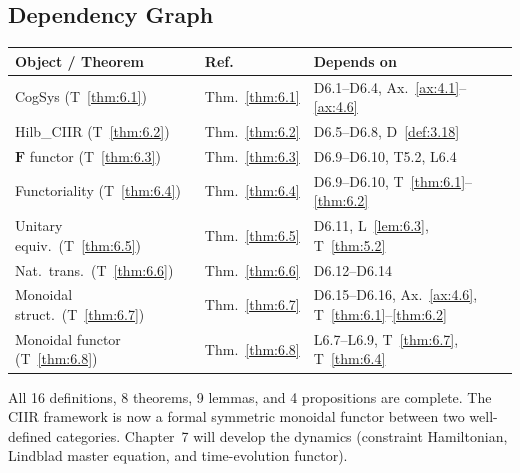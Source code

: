 \subsection{Dependency Graph}
\label{sec:ch6:depgraph}

\begin{center}
\begin{tabular}{lll}
\hline
\textbf{Object / Theorem} & \textbf{Ref.} & \textbf{Depends on} \\
\hline
CogSys (T~\ref{thm:6.1}) & Thm.~\ref{thm:6.1} &
  D6.1--D6.4, Ax.~\ref{ax:4.1}--\ref{ax:4.6} \\
Hilb\_CIIR (T~\ref{thm:6.2}) & Thm.~\ref{thm:6.2} &
  D6.5--D6.8, D~\ref{def:3.18} \\
$\mathbf{F}$ functor (T~\ref{thm:6.3}) & Thm.~\ref{thm:6.3} &
  D6.9--D6.10, T5.2, L6.4 \\
Functoriality (T~\ref{thm:6.4}) & Thm.~\ref{thm:6.4} &
  D6.9--D6.10, T~\ref{thm:6.1}--\ref{thm:6.2} \\
Unitary equiv.\ (T~\ref{thm:6.5}) & Thm.~\ref{thm:6.5} &
  D6.11, L~\ref{lem:6.3}, T~\ref{thm:5.2} \\
Nat.\ trans.\ (T~\ref{thm:6.6}) & Thm.~\ref{thm:6.6} &
  D6.12--D6.14 \\
Monoidal struct.\ (T~\ref{thm:6.7}) & Thm.~\ref{thm:6.7} &
  D6.15--D6.16, Ax.~\ref{ax:4.6}, T~\ref{thm:6.1}--\ref{thm:6.2} \\
Monoidal functor (T~\ref{thm:6.8}) & Thm.~\ref{thm:6.8} &
  L6.7--L6.9, T~\ref{thm:6.7}, T~\ref{thm:6.4} \\
\hline
\end{tabular}
\end{center}

\medskip
\noindent
All 16 definitions, 8 theorems, 9 lemmas, and 4 propositions are
complete.  The CIIR framework is now a formal symmetric monoidal functor
between two well-defined categories.  Chapter~7 will develop the
dynamics (constraint Hamiltonian, Lindblad master equation, and
time-evolution functor).
